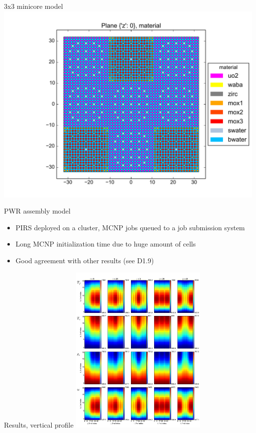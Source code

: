 \begin{frame}{3x3 minicore model}
    \includegraphics[width=\textwidth]{examples/a_model_z.pdf}
\end{frame}

\begin{frame}{PWR assembly model}
    \begin{itemize}
        \item PIRS deployed on a cluster, MCNP jobs queued to a job submission system
        \item Long MCNP initialization time due to huge amount of cells 
        \item Good agreement with other results (see D1.9)
    \end{itemize}
\end{frame}


\begin{frame}{Results, vertical profile}
    \includegraphics[width=0.5\textwidth]{examples/map_anton_i.pdf}
\end{frame}

